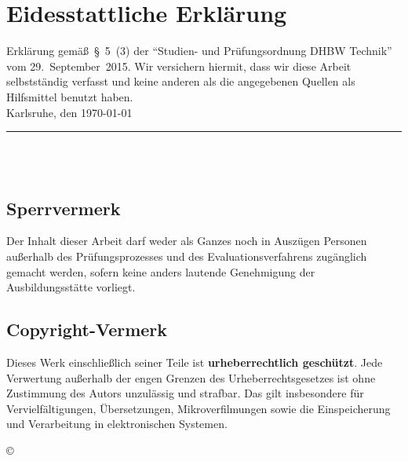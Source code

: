 \chapter*{Eidesstattliche Erklärung}

Erklärung gemäß~§~5~(3) der "`Studien- und Prüfungsordnung DHBW Technik"' vom 29.~September~2015. Wir versichern hiermit, dass wir diese Arbeit selbstständig verfasst und keine anderen als die angegebenen Quellen als Hilfsmittel benutzt haben.\\[4ex]

\noindent Karlsruhe, den \today \\[8ex]
\noindent \rule{5cm}{0.5pt} \\
\noindent \autor\\

\section*{Sperrvermerk}

Der Inhalt dieser Arbeit darf weder als Ganzes noch in Auszügen Personen außerhalb des Prüfungsprozesses und des Evaluationsverfahrens zugänglich gemacht werden, sofern keine anders lautende Genehmigung der Ausbildungsstätte vorliegt.

\section*{Copyright-Vermerk}

Dieses Werk einschließlich seiner Teile ist \textbf{urheberrechtlich geschützt}. Jede Verwertung außerhalb der engen Grenzen des Urheberrechtsgesetzes ist ohne Zustimmung des Autors unzulässig und strafbar. Das gilt insbesondere für Vervielfältigungen, Übersetzungen, Mikroverfilmungen sowie die Einspeicherung und Verarbeitung in elektronischen Systemen.

\begin{flushright}
    \copyright{} \jahr
\end{flushright}

\clearpage